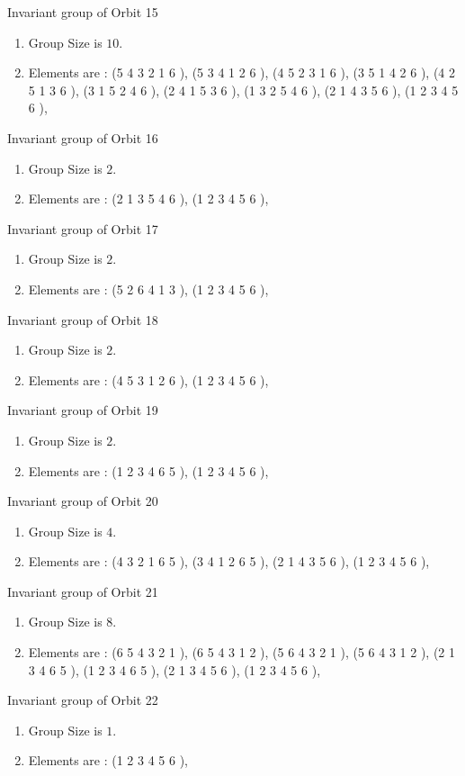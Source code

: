 \documentclass[12pt]{article}
\begin{document}
Invariant group of Orbit 15
\begin{enumerate}
\item Group Size is $10$.
\item Elements are : (5 4 3 2 1 6  ), (5 3 4 1 2 6  ), (4 5 2 3 1 6  ), (3 5 1 4 2 6  ), (4 2 5 1 3 6  ), (3 1 5 2 4 6  ), (2 4 1 5 3 6  ), (1 3 2 5 4 6  ), (2 1 4 3 5 6  ), (1 2 3 4 5 6  ), 
\end{enumerate}
Invariant group of Orbit 16
\begin{enumerate}
\item Group Size is $2$.
\item Elements are : (2 1 3 5 4 6  ), (1 2 3 4 5 6  ), 
\end{enumerate}
Invariant group of Orbit 17
\begin{enumerate}
\item Group Size is $2$.
\item Elements are : (5 2 6 4 1 3  ), (1 2 3 4 5 6  ), 
\end{enumerate}
Invariant group of Orbit 18
\begin{enumerate}
\item Group Size is $2$.
\item Elements are : (4 5 3 1 2 6  ), (1 2 3 4 5 6  ), 
\end{enumerate}
Invariant group of Orbit 19
\begin{enumerate}
\item Group Size is $2$.
\item Elements are : (1 2 3 4 6 5  ), (1 2 3 4 5 6  ), 
\end{enumerate}
Invariant group of Orbit 20
\begin{enumerate}
\item Group Size is $4$.
\item Elements are : (4 3 2 1 6 5  ), (3 4 1 2 6 5  ), (2 1 4 3 5 6  ), (1 2 3 4 5 6  ), 
\end{enumerate}
Invariant group of Orbit 21
\begin{enumerate}
\item Group Size is $8$.
\item Elements are : (6 5 4 3 2 1  ), (6 5 4 3 1 2  ), (5 6 4 3 2 1  ), (5 6 4 3 1 2  ), (2 1 3 4 6 5  ), (1 2 3 4 6 5  ), (2 1 3 4 5 6  ), (1 2 3 4 5 6  ), 
\end{enumerate}
Invariant group of Orbit 22
\begin{enumerate}
\item Group Size is $1$.
\item Elements are : (1 2 3 4 5 6  ), 
\end{enumerate}
\end{document}
